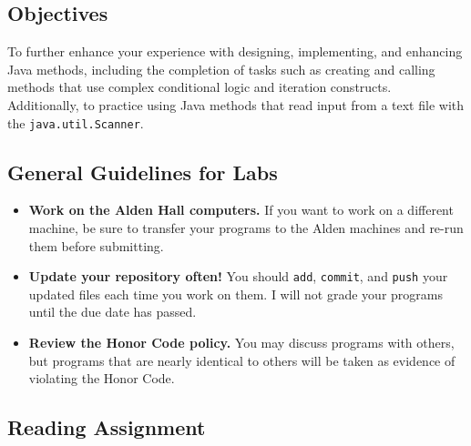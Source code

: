 



\vspace{-0.2in}
\subsection*{Objectives}
\vspace{-0.05in}

To further enhance your experience with designing, implementing, and enhancing Java methods, including the completion of
tasks such as creating and calling methods that use complex conditional logic and iteration constructs.  Additionally,
to practice using Java methods that read input from a text file with the {\tt java.util.Scanner}.

\vspace{-0.15in}
\subsection*{General Guidelines for Labs}
\vspace{-0.05in}

\begin{itemize}
\item
{\bf Work on the Alden Hall computers.} If you want to work on a different
machine, be sure to transfer your programs to the Alden
machines and re-run them before submitting.
\item
  {\bf Update your repository often!} You should {\tt add}, {\tt commit}, 
  and {\tt push} your updated files each time you work on them.  I will not grade 
your programs until the due date has passed.
\item
{\bf Review the Honor Code policy.} You
may discuss programs with others, but programs that are nearly identical
to others will be taken as evidence of violating the Honor Code.
\end{itemize}

\vspace{-0.15in}
\subsection*{Reading Assignment}
\vspace{-0.05in}

